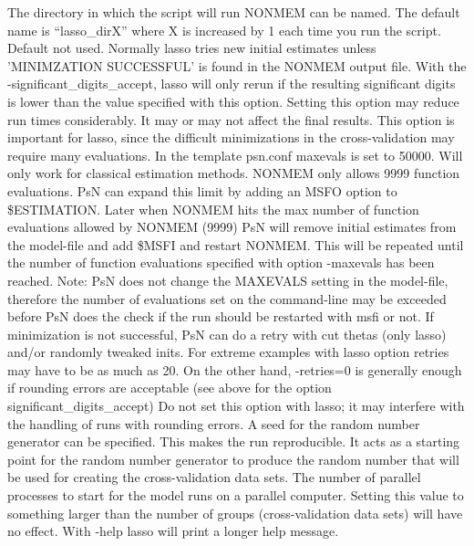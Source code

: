 \begin{optionlist}
The directory in which the script will run NONMEM can be named. The default name is “lasso\_dirX” where X is increased by 1 each time you run the script. 
\nextopt
{}
Default not used. Normally lasso tries new initial estimates unless 'MINIMZATION SUCCESSFUL' is found in the NONMEM output file. With the -significant\_digits\_accept, lasso will only rerun if the resulting significant digits is lower than the value specified with this option. Setting this option may reduce run times considerably. It may or may not affect the final results. 
\nextopt
{}
This option is important for lasso, since the difficult minimizations in the cross-validation may require many evaluations. In the template psn.conf maxevals is set to 50000. Will only work for classical estimation methods. NONMEM only allows 9999 function evaluations. PsN can expand this limit by adding an MSFO option to \$ESTIMATION. Later when NONMEM hits the max number of function evaluations allowed by NONMEM (9999) PsN will remove initial estimates from the model-file and add \$MSFI and restart NONMEM. This will be repeated until the number of function evaluations specified with option -maxevals has been reached. Note: PsN does not change the MAXEVALS setting in the model-file, therefore the number of evaluations set on the command-line may be exceeded before PsN does the check if the run should be restarted with msfi or not. 
\nextopt
{}
If minimization is not successful, PsN can do a retry with cut thetas (only lasso) and/or randomly tweaked inits. For extreme examples with lasso option retries may have to be as much as 20. On the other hand, -retries=0 is generally enough if rounding errors are acceptable (see above for the option significant\_digits\_accept) 
\nextopt
{}
Do not set this option with lasso; it may interfere with the handling of runs with rounding errors. 
\nextopt
{}
A seed for the random number generator can be specified. This makes the run reproducible. It acts as a starting point for the random number generator to produce the random number that will be used for creating the cross-validation data sets. 
\nextopt
{}
The number of parallel processes to start for the model runs on a parallel computer. Setting this value to something larger than the number of groups (cross-validation data sets) will have no effect. 
\nextopt
{}
With -help lasso will print a longer help message. 
\nextopt
\end{optionlist}

